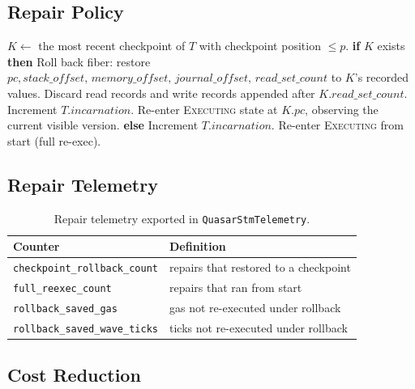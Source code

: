 \subsection{Repair Policy}

\begin{algorithm}[H]
\caption{Repair transaction $T$ after invalidated read at canonical
position $p$}
\label{alg:repair}
\begin{algorithmic}[1]
\State $K \gets$ the most recent checkpoint of $T$ with checkpoint
       position $\leq p$.
\State \textbf{if} $K$ exists \textbf{then}
\State \quad Roll back fiber: restore
       $\mathit{pc}, \mathit{stack\_offset},\,
       \mathit{memory\_offset},\, \mathit{journal\_offset},\,
       \mathit{read\_set\_count}$ to $K$'s recorded values.
\State \quad Discard read records and write records appended after
       $K.\mathit{read\_set\_count}$.
\State \quad Increment $T.\mathit{incarnation}$.
\State \quad Re-enter \textsc{Executing} state at $K.\mathit{pc}$,
       observing the current visible version.
\State \textbf{else}
\State \quad Increment $T.\mathit{incarnation}$.
\State \quad Re-enter \textsc{Executing} from start (full re-exec).
\end{algorithmic}
\end{algorithm}

\subsection{Repair Telemetry}

\begin{table}[ht]
\centering
\begin{tabular}{@{}ll@{}}
\toprule
\textbf{Counter} & \textbf{Definition} \\
\midrule
\texttt{checkpoint\_rollback\_count}  & repairs that restored to a checkpoint \\
\texttt{full\_reexec\_count}          & repairs that ran from start \\
\texttt{rollback\_saved\_gas}         & gas not re-executed under rollback \\
\texttt{rollback\_saved\_wave\_ticks} & ticks not re-executed under rollback \\
\bottomrule
\end{tabular}
\caption{Repair telemetry exported in \texttt{QuasarStmTelemetry}.}
\label{tab:repair-telemetry}
\end{table}

\subsection{Cost Reduction}

